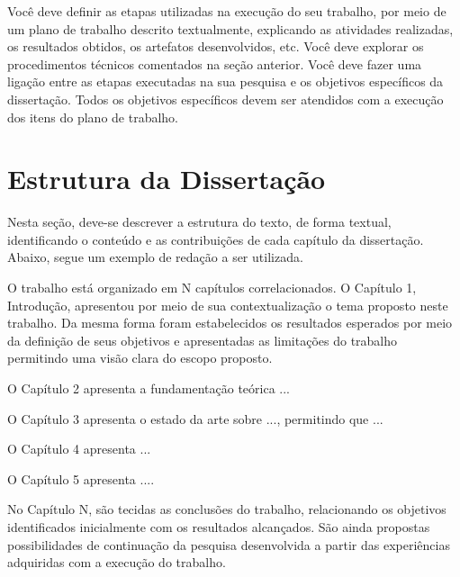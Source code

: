 Você deve definir as etapas utilizadas na execução do seu trabalho, por meio de um plano de trabalho descrito textualmente, explicando as atividades realizadas, os resultados obtidos, os artefatos desenvolvidos, etc. Você deve explorar os procedimentos técnicos comentados na seção anterior. Você deve fazer uma ligação entre as etapas executadas na sua pesquisa e os objetivos específicos da dissertação. Todos os objetivos específicos devem ser atendidos com a execução dos itens do plano de trabalho.



\section{Estrutura da Dissertação}
\label{s_cintro_estrutura}

Nesta seção, deve-se descrever a estrutura do texto, de forma textual, identificando o conteúdo e as contribuições de cada capítulo da dissertação. Abaixo, segue um exemplo de redação a ser utilizada.

O trabalho está organizado em N capítulos correlacionados. O Capítulo 1, Introdução, apresentou por meio de sua contextualização o tema proposto neste trabalho. Da mesma forma foram estabelecidos os resultados esperados por meio da definição de seus objetivos e apresentadas as limitações do trabalho permitindo uma visão clara do escopo proposto.

O Capítulo 2 apresenta a fundamentação teórica ...

O Capítulo 3 apresenta o estado da arte sobre ..., permitindo que ...

O Capítulo 4 apresenta ...

O Capítulo 5 apresenta ....

No Capítulo N, são tecidas as conclusões do trabalho, relacionando os objetivos identificados inicialmente com os resultados alcançados. São ainda propostas possibilidades de continuação da pesquisa desenvolvida a partir das experiências adquiridas com a execução do trabalho.

